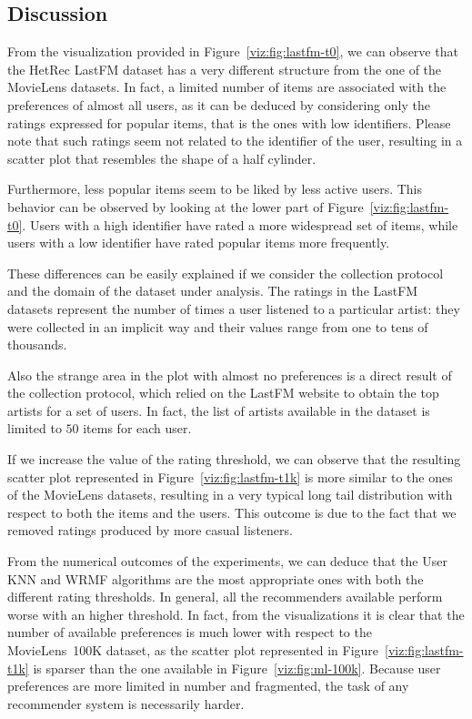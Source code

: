 \subsection{Discussion}

From the visualization provided in Figure~\ref{viz:fig:lastfm-t0}, we can observe that the HetRec LastFM dataset has a very different structure from the one of the MovieLens datasets. In fact, a limited number of items are associated with the preferences of almost all users, as it can be deduced by considering only the ratings expressed for popular items, that is the ones with low identifiers. Please note that such ratings seem not related to the identifier of the user, resulting in a scatter plot that resembles the shape of a half cylinder.

Furthermore, less popular items seem to be liked by less active users. This behavior can be observed by looking at the lower part of Figure~\ref{viz:fig:lastfm-t0}. Users with a high identifier have rated a more widespread set of items, while users with a low identifier have rated popular items more frequently.

These differences can be easily explained if we consider the collection protocol and the domain of the dataset under analysis. The ratings in the LastFM datasets represent the number of times a user listened to a particular artist: they were collected in an implicit way and their values range from one to tens of thousands.

Also the strange area in the plot with almost no preferences is a direct result of the collection protocol, which relied on the LastFM website to obtain the top artists for a set of users. In fact, the list of artists available in the dataset is limited to $50$ items for each user.

If we increase the value of the rating threshold, we can observe that the resulting scatter plot represented in Figure~\ref{viz:fig:lastfm-t1k} is more similar to the ones of the MovieLens datasets, resulting in a very typical long tail distribution with respect to both the items and the users. This outcome is due to the fact that we removed ratings produced by more casual listeners.

From the numerical outcomes of the experiments, we can deduce that the User KNN and WRMF algorithms are the most appropriate ones with both the different rating thresholds. In general, all the recommenders available perform worse with an higher threshold. In fact, from the visualizations it is clear that the number of available preferences is much lower with respect to the MovieLens~100K dataset, as the scatter plot represented in Figure~\ref{viz:fig:lastfm-t1k} is sparser than the one available in Figure~\ref{viz:fig:ml-100k}. Because user preferences are more limited in number and fragmented, the task of any recommender system is necessarily harder.

